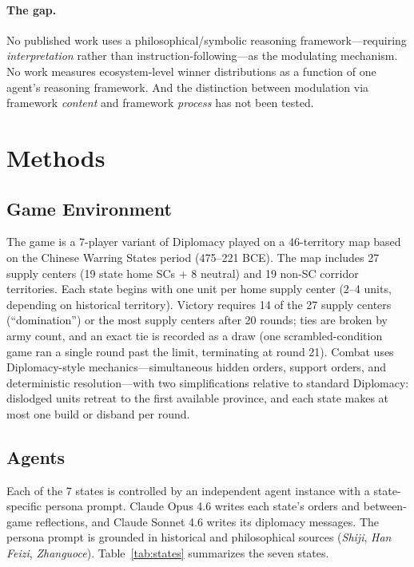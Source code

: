 \documentclass[11pt]{article}
\begin{document}
\paragraph{The gap.}
No published work uses a philosophical/symbolic reasoning framework---requiring \emph{interpretation} rather than instruction-following---as the modulating mechanism. No work measures ecosystem-level winner distributions as a function of one agent's reasoning framework. And the distinction between modulation via framework \emph{content} and framework \emph{process} has not been tested.


\section{Methods}
\label{sec:methods}

\subsection{Game Environment}

The game is a 7-player variant of Diplomacy played on a 46-territory map based on the Chinese Warring States period (475--221 BCE). The map includes 27 supply centers (19 state home SCs + 8 neutral) and 19 non-SC corridor territories. Each state begins with one unit per home supply center (2--4 units, depending on historical territory). Victory requires 14 of the 27 supply centers (``domination'') or the most supply centers after 20 rounds; ties are broken by army count, and an exact tie is recorded as a draw (one scrambled-condition game ran a single round past the limit, terminating at round 21). Combat uses Diplomacy-style mechanics---simultaneous hidden orders, support orders, and deterministic resolution---with two simplifications relative to standard Diplomacy: dislodged units retreat to the first available province, and each state makes at most one build or disband per round.

\subsection{Agents}

Each of the 7 states is controlled by an independent agent instance with a state-specific persona prompt. Claude Opus 4.6 writes each state's orders and between-game reflections, and Claude Sonnet 4.6 writes its diplomacy messages. The persona prompt is grounded in historical and philosophical sources (\emph{Shiji}, \emph{Han Feizi}, \emph{Zhanguoce}). Table~\ref{tab:states} summarizes the seven states.
\end{document}
